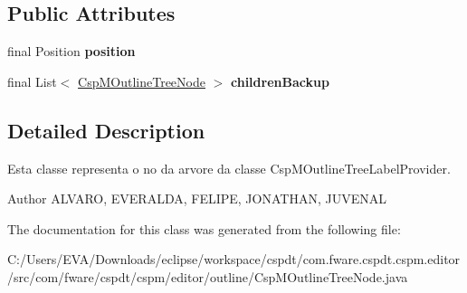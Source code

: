 \subsection*{Public Attributes}
\begin{DoxyCompactItemize}
\item 
\mbox{\label{classcom_1_1fware_1_1cspdt_1_1cspm_1_1editor_1_1outline_1_1_csp_m_outline_tree_node_a9f5d3f63d60f0c3d7df37ea321fc4f5b}} 
final Position {\bfseries position}
\item 
\mbox{\label{classcom_1_1fware_1_1cspdt_1_1cspm_1_1editor_1_1outline_1_1_csp_m_outline_tree_node_a4a1ec256a0b76c3143d1e86587303961}} 
final List$<$ \hyperlink{classcom_1_1fware_1_1cspdt_1_1cspm_1_1editor_1_1outline_1_1_csp_m_outline_tree_node}{Csp\+M\+Outline\+Tree\+Node} $>$ {\bfseries children\+Backup}
\end{DoxyCompactItemize}


\subsection{Detailed Description}
Esta classe representa o no da arvore da classe Csp\+M\+Outline\+Tree\+Label\+Provider. 

\begin{DoxyAuthor}{Author}
A\+L\+V\+A\+RO, E\+V\+E\+R\+A\+L\+DA, F\+E\+L\+I\+PE, J\+O\+N\+A\+T\+H\+AN, J\+U\+V\+E\+N\+AL 
\end{DoxyAuthor}


The documentation for this class was generated from the following file\+:\begin{DoxyCompactItemize}
\item 
C\+:/\+Users/\+E\+V\+A/\+Downloads/eclipse/workspace/cspdt/com.\+fware.\+cspdt.\+cspm.\+editor/src/com/fware/cspdt/cspm/editor/outline/Csp\+M\+Outline\+Tree\+Node.\+java\end{DoxyCompactItemize}
